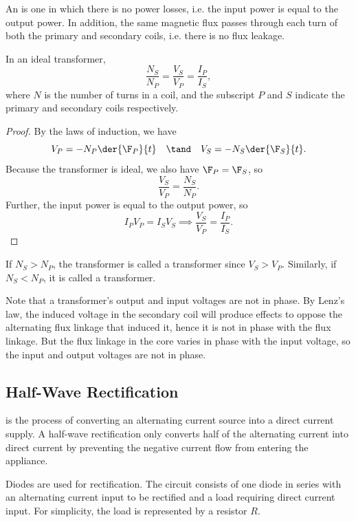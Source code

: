An  is one in which there is no power losses, i.e. the input power is equal to the output power. In addition, the same magnetic flux passes through each turn of both the primary and secondary coils, i.e. there is no flux leakage.

\begin{proposition}
    In an ideal transformer, \[\frac{N_S}{N_P} = \frac{V_S}{V_P} = \frac{I_P}{I_S},\] where $N$ is the number of turns in a coil, and the subscript $P$ and $S$ indicate the primary and secondary coils respectively.
\end{proposition}
\begin{proof}
    By the laws of induction, we have \[V_P = -N_P \der{\F_P}{t} \quad \tand \quad V_S = -N_S \der{\F_S}{t}.\] Because the transformer is ideal, we also have $\F_P = \F_S$, so \[\frac{V_S}{V_P} = \frac{N_S}{N_P}.\] Further, the input power is equal to the output power, so \[I_P V_P = I_S V_S \implies \frac{V_S}{V_P} = \frac{I_P}{I_S}.\]
\end{proof}

If $N_S > N_P$, the transformer is called a  transformer since $V_S > V_P$. Similarly, if $N_S < N_P$, it is called a  transformer.

Note that a transformer's output and input voltages are not in phase. By Lenz's law, the induced voltage in the secondary coil will produce effects to oppose the alternating flux linkage that induced it, hence it is not in phase with the flux linkage. But the flux linkage in the core varies in phase with the input voltage, so the input and output voltages are not in phase.

\subsection{Half-Wave Rectification}

 is the process of converting an alternating current source into a direct current supply. A half-wave rectification only converts half of the alternating current into direct current by preventing the negative current flow from entering the appliance.

Diodes are used for rectification. The circuit consists of one diode in series with an alternating current input to be rectified and a load requiring direct current input. For simplicity, the load is represented by a resistor $R$.

